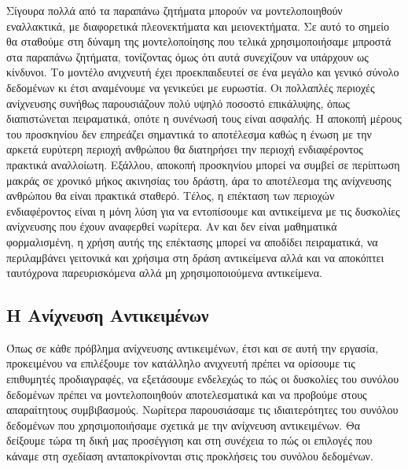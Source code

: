 \documentclass[11pt,a4paper,english,greek,twoside]{../Thesis}
\begin{document}
\par Σίγουρα πολλά από τα παραπάνω ζητήματα μπορούν να μοντελοποιηθούν εναλλακτικά, με διαφορετικά πλεονεκτήματα και μειονεκτήματα. Σε αυτό το σημείο θα σταθούμε στη δύναμη της μοντελοποίησης που τελικά χρησιμοποιήσαμε μπροστά στα παραπάνω ζητήματα, τονίζοντας όμως ότι αυτά συνεχίζουν να υπάρχουν ως κίνδυνοι. Το μοντέλο ανιχνευτή έχει προεκπαιδευτεί σε ένα μεγάλο και γενικό σύνολο δεδομένων κι έτσι αναμένουμε να γενικεύει με ευρωστία. Οι πολλαπλές περιοχές ανίχνευσης συνήθως παρουσιάζουν πολύ υψηλό ποσοστό επικάλυψης, όπως διαπιστώνεται πειραματικά, οπότε η συνένωσή τους είναι ασφαλής. Η αποκοπή μέρους του προσκηνίου δεν επηρεάζει σημαντικά το αποτέλεσμα καθώς η ένωση με την αρκετά ευρύτερη περιοχή ανθρώπου θα διατηρήσει την περιοχή ενδιαφέροντος πρακτικά αναλλοίωτη. Εξάλλου, αποκοπή προσκηνίου μπορεί να συμβεί σε περίπτωση μακράς σε χρονικό μήκος ακινησίας του δράστη, άρα το αποτέλεσμα της ανίχνευσης ανθρώπου θα είναι πρακτικά σταθερό. Τέλος, η επέκταση των περιοχών ενδιαφέροντος είναι η μόνη λύση για να εντοπίσουμε και αντικείμενα με τις δυσκολίες ανίχνευσης που έχουν αναφερθεί νωρίτερα. Αν και δεν είναι μαθηματικά φορμαλισμένη, η χρήση αυτής της επέκτασης μπορεί να αποδίδει πειραματικά, να περιλαμβάνει γειτονικά και χρήσιμα στη δράση αντικείμενα αλλά και να αποκόπτει ταυτόχρονα παρευρισκόμενα αλλά μη χρησιμοποιούμενα αντικείμενα.


\subsection{Η Ανίχνευση Αντικειμένων}
Όπως σε κάθε πρόβλημα ανίχνευσης αντικειμένων, έτσι και σε αυτή την εργασία, προκειμένου να επιλέξουμε τον κατάλληλο ανιχνευτή πρέπει να ορίσουμε τις επιθυμητές προδιαγραφές, να εξετάσουμε ενδελεχώς το πώς οι δυσκολίες του συνόλου δεδομένων πρέπει να μοντελοποιηθούν αποτελεσματικά και να προβούμε στους απαραίτητους συμβιβασμούς. Νωρίτερα παρουσιάσαμε τις ιδιαιτερότητες του συνόλου δεδομένων που χρησιμοποιήσαμε σχετικά με την ανίχνευση αντικειμένων. Θα δείξουμε τώρα τη δική μας προσέγγιση και στη συνέχεια το πώς οι επιλογές που κάναμε στη σχεδίαση ανταποκρίνονται στις προκλήσεις του συνόλου δεδομένων.
\end{document}
